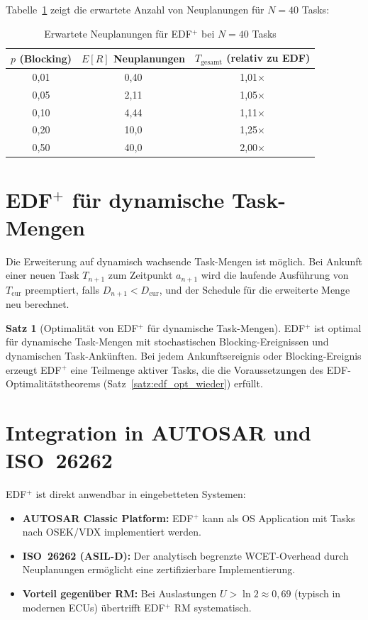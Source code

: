 ﻿\documentclass[a4paper,12pt]{report}
\theoremstyle{definition}
\newtheorem{satz}{Satz}[chapter]
\begin{document}
Tabelle~\ref{tab:edfplus_blocking} zeigt die erwartete Anzahl von Neuplanungen
für $N = 40$ Tasks:

\begin{table}[H]
	\centering
	\caption{Erwartete Neuplanungen für EDF$^+$ bei $N=40$ Tasks}
	\label{tab:edfplus_blocking}
	\begin{tabular}{ccc}
		\toprule
		$p$ (Blocking) & $E[R]$ Neuplanungen & $T_{\text{gesamt}}$ (relativ zu EDF) \\
		\midrule
		0{,}01 & 0{,}40  & 1{,}01$\times$ \\
		0{,}05 & 2{,}11  & 1{,}05$\times$ \\
		0{,}10 & 4{,}44  & 1{,}11$\times$ \\
		0{,}20 & 10{,}0  & 1{,}25$\times$ \\
		0{,}50 & 40{,}0  & 2{,}00$\times$ \\
		\bottomrule
	\end{tabular}
\end{table}

\section{EDF$^+$ für dynamische Task-Mengen}

Die Erweiterung auf dynamisch wachsende Task-Mengen ist möglich. Bei Ankunft
einer neuen Task $T_{n+1}$ zum Zeitpunkt $a_{n+1}$ wird die laufende Ausführung
von $T_{\text{cur}}$ preemptiert, falls $D_{n+1} < D_{\text{cur}}$, und der
Schedule für die erweiterte Menge neu berechnet.

\begin{satz}[Optimalität von EDF$^+$ für dynamische Task-Mengen]
	EDF$^+$ ist optimal für dynamische Task-Mengen mit stochastischen
	Blocking-Ereignissen und dynamischen Task-Ankünften. Bei jedem
	Ankunftsereignis oder Blocking-Ereignis erzeugt EDF$^+$ eine Teilmenge
	aktiver Tasks, die die Voraussetzungen des EDF-Optimalitätstheorems
	(Satz~\ref{satz:edf_opt_wieder}) erfüllt.
\end{satz}

\section{Integration in AUTOSAR und ISO~26262}

EDF$^+$ ist direkt anwendbar in eingebetteten Systemen:

\begin{itemize}
	\item \textbf{AUTOSAR Classic Platform:} EDF$^+$ kann als OS Application
	      mit Tasks nach OSEK/VDX implementiert werden.
	\item \textbf{ISO~26262 (ASIL-D):} Der analytisch begrenzte WCET-Overhead
	      durch Neuplanungen ermöglicht eine zertifizierbare Implementierung.
	\item \textbf{Vorteil gegenüber RM:} Bei Auslastungen $U > \ln 2 \approx 0{,}69$
	      (typisch in modernen ECUs) übertrifft EDF$^+$ RM systematisch.
\end{itemize}
\end{document}

